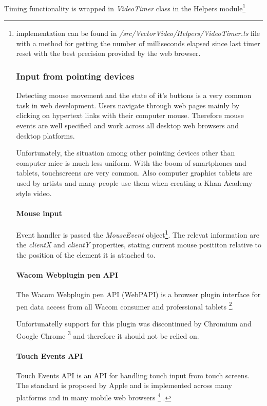Timing functionality is wrapped in \textit{VideoTimer} class in the Helpers module\footnote{implementation can be found in \textit{/src/VectorVideo/Helpers/VideoTimer.ts} file with a method for getting the number of milliseconds elapsed since last timer reset with the best precision provided by the web browser.



\subsubsection{Input from pointing devices}

Detecting mouse movement and the state of it's buttons is a very common task in web development. Users navigate through web pages mainly by clicking on hypertext links with their computer mouse. Therefore mouse events are well specified and work across all desktop web browsers and desktop platforms.

Unfortunately, the situation among other pointing devices other than computer mice is much less uniform. With the boom of smartphones and tablets, touchscreens are very common. Also computer graphics tablets are used by artists and many people use them when creating a Khan Academy style video.

\paragraph{Mouse input}
Event handler is passed the \textit{MouseEvent} object\footnote{http://www.w3.org/TR/DOM-Level-2-Events/events.html#Events-MouseEvent}. The relevat information are the \textit{clientX} and \textit{clientY} properties, stating current mouse posititon relative to the position of the element it is attached to. 

\paragraph{Wacom Webplugin pen API}
The Wacom Webplugin pen API (WebPAPI) is a browser plugin interface for pen data access from all Wacom consumer and professional tablets \cite{}\footnote{http://www.wacomeng.com/web/WebPluginReleaseNotes.htm}.

Unfortunatelly support for this plugin was discontinued by Chromium and Google Chrome \footnote{http://blog.chromium.org/2013/09/saying-goodbye-to-our-old-friend-npapi.htm} and therefore it should not be relied on.

\paragraph{Touch Events API}
Touch Events API is an API for handling touch input from touch screens. The standard is proposed by Apple and is implemented across many platforms and in many mobile web browsers \footnote{http://caniuse.com/\#feat=touch} \cite{}.

}
